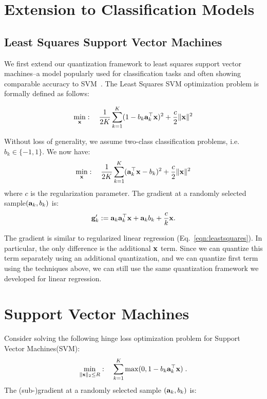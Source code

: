 \documentclass{article}
\def\a{{\bf a}}
\def\g{{\bf g}}
\def\x{{\bf x}}
\begin{document}
\section{Extension to Classification Models}

\subsection{Least Squares Support Vector Machines}

We first extend our quantization framework to 
least squares support vector machines--a model
popularly used for classification tasks and
often showing comparable accuracy to
SVM~\cite{ye2007svm}.
The  Least Squares SVM optimization problem is formally defined as follows: 

\begin{align*}
\min_{\x}:\quad {1\over 2K}\sum_{k=1}^K (1-b_k\a_k^\top \x)^2 + {c\over 2}\|\x\|^2
\end{align*}

\noindent Without
loss of generality, we assume two-class classification problems, i.e.  $b_k \in \{-1, 1\}$.
We now have:
\begin{align*}
\min_{\x}:\quad {1\over 2K}\sum_{k=1}^K (\a_k^\top \x - b_k)^2 + {c\over 2}\|\x\|^2
\end{align*}
where $c$ is the regularization parameter. The gradient at a randomly selected sample$(\a_k, b_k)$ is: 
\[
\g'_k := \a_k \a_k^\top \x + \a_k b_k + {c\over k} \x.
\]

The gradient is similar to regularized linear regression (Eq.~\ref{eqn:leastsquares}). 
In particular, the only difference is the additional $\x$ term.
Since we can quantize this term separately using an additional quantization, and we can quantize first term using the techniques above, we can still use 
the same quantization framework we developed
for linear regression.

\section{Support Vector Machines}

Consider solving the following hinge loss optimization problem for Support Vector Machines(SVM):
\begin{align*}
\min_{\| \x \|_2 \leq R}:\quad \sum_{k=1}^K \max(0, 1 - b_k \a_k^\top \x) \; .
\end{align*}
The (sub-)gradient at a randomly selected sample $(\a_k, b_k)$ is: 
\end{document}
